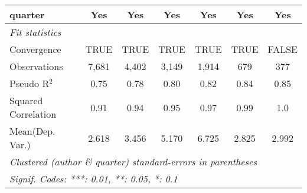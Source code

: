 \begin{tabular}{lcccccc}
   quarter                                                    & Yes           & Yes           & Yes          & Yes           & Yes         & Yes\\  
   \midrule
   \emph{Fit statistics}\\
   Convergence                                                &TRUE           & TRUE          & TRUE         & TRUE          & TRUE        & FALSE\\  
   Observations                                               & 7,681         & 4,402         & 3,149        & 1,914         & 679         & 377\\  
   Pseudo R$^2$                                               & 0.75          & 0.78          & 0.80         & 0.82          & 0.84        & 0.85\\  
   Squared Correlation                                        & 0.91          & 0.94          & 0.95         & 0.97          & 0.99        & 1.0\\  
Mean(Dep. Var.) & 2.618 & 3.456 & 5.170 & 6.725 & 2.825 & 2.992 \\
   \midrule \midrule
   \multicolumn{7}{l}{\emph{Clustered (author \& quarter) standard-errors in parentheses}}\\
   \multicolumn{7}{l}{\emph{Signif. Codes: ***: 0.01, **: 0.05, *: 0.1}}\\
\end{tabular}
\par\endgroup
